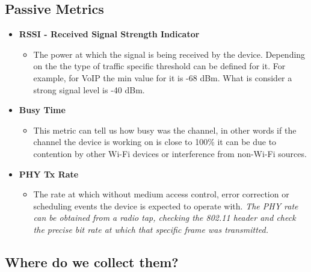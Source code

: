 \subsection*{Passive Metrics}

\begin{itemize}
	\item \textbf{RSSI - Received Signal Strength Indicator}
	\begin{itemize}
		\item The power at which the signal is being received by the device. Depending on the the type of traffic specific threshold can be defined for it. For example, for VoIP the min value for it is -68 dBm. What is consider a strong signal level is -40 dBm.
	\end{itemize}

	\item \textbf{Busy Time}
	\begin{itemize}
		\item This metric can tell us how busy was the channel, in other words if the channel the device is working on is close to 100\% it can be due to contention by other Wi-Fi devices or interference from non-Wi-Fi sources.
	\end{itemize}
	
	\item \textbf{PHY Tx Rate}
	\begin{itemize}
		\item 	The rate at which without medium access control, error correction or scheduling events the device is expected to operate with.
		\emph{The PHY rate can be obtained from a radio tap, checking the 802.11 header and check the precise bit rate at which that specific frame was transmitted.}
	\end{itemize}

\end{itemize}

\subsection{Where do we collect them?}


